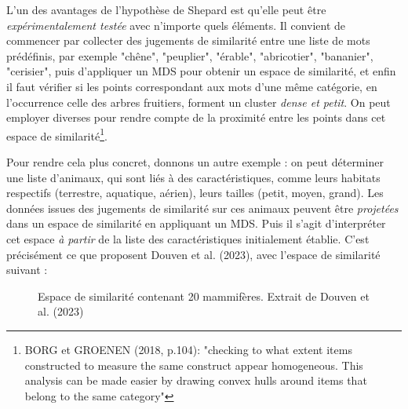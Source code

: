 \documentclass{article}
\begin{document}
\par
L’un des avantages de l’hypothèse de Shepard est qu’elle peut être \textit{expérimentalement testée} avec n’importe quels éléments. Il convient de commencer par collecter des jugements de similarité entre une liste de mots prédéfinis, par exemple "chêne", "peuplier", "érable", "abricotier", "bananier", "cerisier", puis d’appliquer un MDS pour obtenir un espace de similarité, et enfin il faut vérifier si les points correspondant aux mots d’une même catégorie, en l’occurrence celle des arbres fruitiers, forment un cluster \textit{dense et petit}. On peut employer diverses pour rendre compte de la proximité entre les points dans cet espace de similarité\footnote{BORG et GROENEN (2018, p.104): "checking to what extent items constructed to measure the same construct appear homogeneous. This analysis can be made easier by drawing convex hulls around items that belong to the same category"}.
\par
Pour rendre cela plus concret, donnons un autre exemple : on peut déterminer une liste d’animaux, qui sont liés à des caractéristiques, comme leurs habitats respectifs (terrestre, aquatique, aérien), leurs tailles (petit, moyen, grand). Les données issues des jugements de similarité sur ces animaux peuvent être \textit{projetées} dans un espace de similarité en appliquant un MDS. Puis il s’agit d’interpréter cet espace \textit{à partir} de la liste des caractéristiques initialement établie. C’est précisément ce que proposent Douven et al. (2023), avec l’espace de similarité suivant :


\begin{figure}[h!]
\centering
{}
\caption{Espace de similarité contenant 20 mammifères. Extrait de Douven et al. (2023)} 
\end{figure}
\end{document}
